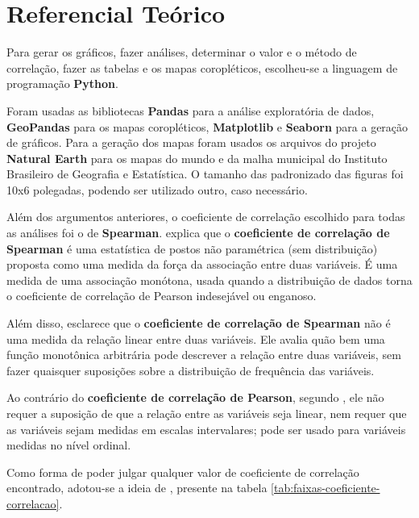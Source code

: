 \chapter{Referencial Teórico}

Para gerar os gráficos, fazer análises, determinar o valor e o método de correlação, fazer as tabelas e os mapas coropléticos, escolheu-se a linguagem de programação \textbf{Python}.

Foram usadas as bibliotecas \textbf{Pandas} para a análise exploratória de dados, \textbf{GeoPandas} para os mapas coropléticos, \textbf{Matplotlib} e \textbf{Seaborn} para a geração  de gráficos. Para a geração dos mapas foram usados os arquivos do projeto \textbf{Natural Earth} para os mapas do mundo e da malha municipal do Instituto Brasileiro de Geografia e Estatística. O tamanho das padronizado das figuras foi 10x6 polegadas, podendo ser utilizado outro, caso necessário.

Além dos argumentos anteriores, o coeficiente de correlação escolhido para todas as análises foi o de \textbf{Spearman}. \cite{hauke2011comparison} explica que o \textbf{coeficiente de correlação de Spearman} é uma estatística de postos não paramétrica (sem distribuição) proposta como uma medida da força da associação entre duas variáveis. É uma medida de uma associação monótona, usada quando a distribuição de dados torna o coeficiente de correlação de Pearson indesejável ou enganoso. 

Além disso, \cite{hauke2011comparison} esclarece que o \textbf{coeficiente de correlação de Spearman} não é uma medida da relação linear entre duas variáveis. Ele avalia quão bem uma função monotônica arbitrária pode descrever a relação entre duas variáveis, sem fazer quaisquer suposições sobre a distribuição de frequência das variáveis.

Ao contrário do \textbf{coeficiente de correlação de Pearson}, segundo \cite{hauke2011comparison}, ele não requer a suposição de que a relação entre as variáveis seja linear, nem requer que as variáveis sejam medidas em escalas intervalares; pode ser usado para variáveis medidas no nível ordinal.

Como forma de poder julgar qualquer valor de coeficiente de correlação encontrado, adotou-se a ideia de \cite{ali2022spearman}, presente na tabela \ref{tab:faixas-coeficiente-correlacao}.

